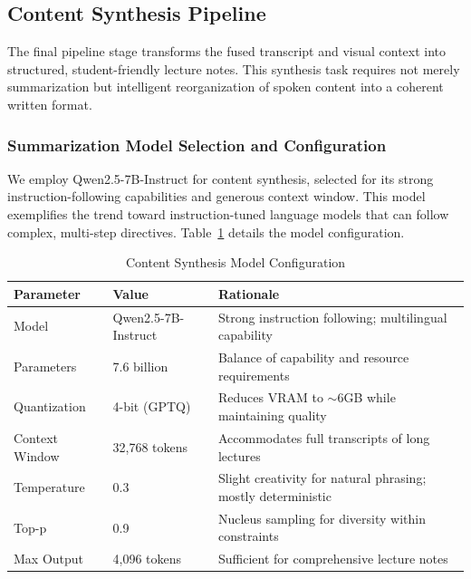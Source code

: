 
\subsection{Content Synthesis Pipeline}

The final pipeline stage transforms the fused transcript and visual context into structured, student-friendly lecture notes. This synthesis task requires not merely summarization but intelligent reorganization of spoken content into a coherent written format.

\subsubsection{Summarization Model Selection and Configuration}

We employ Qwen2.5-7B-Instruct \cite{Bai2023Qwen} for content synthesis, selected for its strong instruction-following capabilities and generous context window. This model exemplifies the trend toward instruction-tuned language models \cite{Ouyang2022} that can follow complex, multi-step directives. Table~\ref{tab:summarization_config} details the model configuration.

\begin{table}[h]
\centering
\caption{Content Synthesis Model Configuration}
\label{tab:summarization_config}
\begin{tabular}{|l|l|p{6cm}|}
\hline
\textbf{Parameter} & \textbf{Value} & \textbf{Rationale} \\
\hline
Model & Qwen2.5-7B-Instruct & Strong instruction following; multilingual capability \\
\hline
Parameters & 7.6 billion & Balance of capability and resource requirements \\
\hline
Quantization & 4-bit (GPTQ) & Reduces VRAM to $\sim$6GB while maintaining quality \\
\hline
Context Window & 32,768 tokens & Accommodates full transcripts of long lectures \\
\hline
Temperature & 0.3 & Slight creativity for natural phrasing; mostly deterministic \\
\hline
Top-p & 0.9 & Nucleus sampling for diversity within constraints \\
\hline
Max Output & 4,096 tokens & Sufficient for comprehensive lecture notes \\
\hline
\end{tabular}
\end{table}

